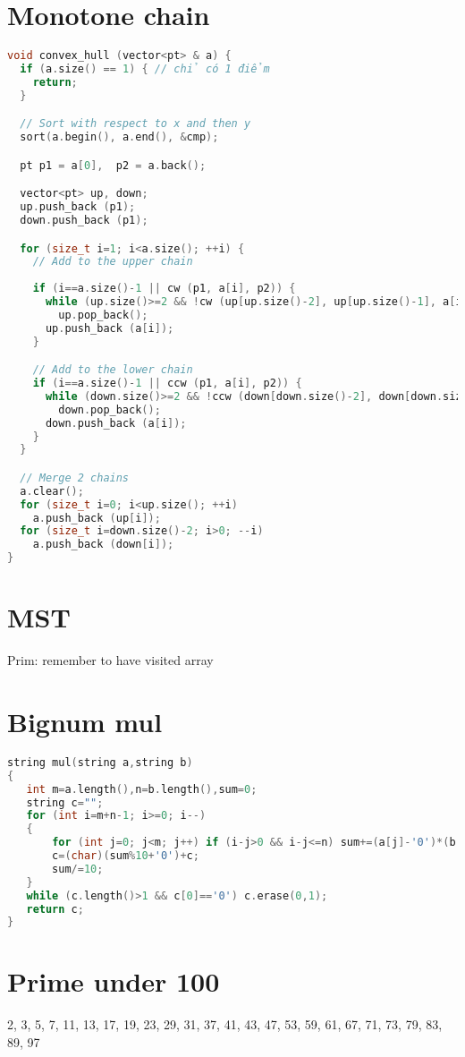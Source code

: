 \documentclass[A4 paper, 12pt]{article}
\begin{document}
	\section{Monotone chain}
	\begin{lstlisting}[language=C++]
void convex_hull (vector<pt> & a) {
  if (a.size() == 1) { // chỉ có 1 điểm
    return;
  }

  // Sort with respect to x and then y
  sort(a.begin(), a.end(), &cmp);

  pt p1 = a[0],  p2 = a.back();

  vector<pt> up, down; 
  up.push_back (p1);
  down.push_back (p1);

  for (size_t i=1; i<a.size(); ++i) { 
    // Add to the upper chain
    
    if (i==a.size()-1 || cw (p1, a[i], p2)) {
      while (up.size()>=2 && !cw (up[up.size()-2], up[up.size()-1], a[i]))
        up.pop_back();
      up.push_back (a[i]);
    }

    // Add to the lower chain
    if (i==a.size()-1 || ccw (p1, a[i], p2)) {
      while (down.size()>=2 && !ccw (down[down.size()-2], down[down.size()-1], a[i]))
        down.pop_back();
      down.push_back (a[i]);
    }
  }

  // Merge 2 chains
  a.clear();
  for (size_t i=0; i<up.size(); ++i)
    a.push_back (up[i]);
  for (size_t i=down.size()-2; i>0; --i)
    a.push_back (down[i]);
}
\end{lstlisting}
	\section{MST}
	Prim: remember to have visited array
	\section{Bignum mul}
	\begin{lstlisting}[language=C++]
string mul(string a,string b)
{
   int m=a.length(),n=b.length(),sum=0;
   string c="";
   for (int i=m+n-1; i>=0; i--)
   {
       for (int j=0; j<m; j++) if (i-j>0 && i-j<=n) sum+=(a[j]-'0')*(b[i-j-1]-'0');
       c=(char)(sum%10+'0')+c;
       sum/=10;
   }
   while (c.length()>1 && c[0]=='0') c.erase(0,1);
   return c;
}
\end{lstlisting}
	\section{Prime under 100}
	2, 3, 5, 7, 11, 13, 17, 19, 23, 29, 31, 37, 41, 43, 47, 53, 59, 61, 67, 71, 73, 79, 83, 89, 97 
\end{document}
